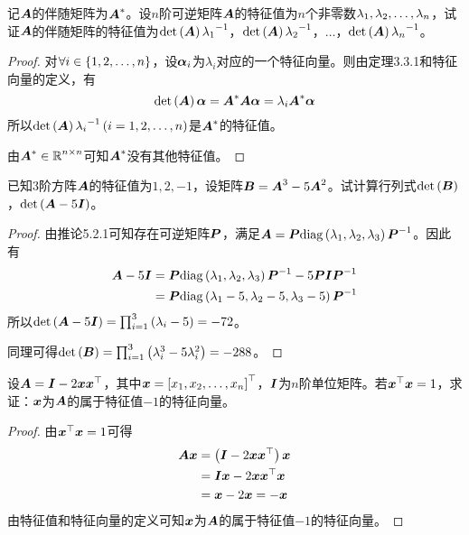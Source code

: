 \begin{problem}
记\(\mata\)的伴随矩阵为\(\mata^*\)。设\(n\)阶可逆矩阵\(\mata\)的特征值为\(n\)个非零数\(\enums{\lambda}{n}\)，试证\(\mata\)的伴随矩阵的特征值为\(\det{\mata}\inv{\lambda_1}\)，\(\det{\mata}\inv{\lambda_2}\)，\(\dots\)，\(\det{\mata}\inv{\lambda_n}\)。
\end{problem}
\begin{proof}
    对\(\forall i\in\setof{1,2,\dots,n}\)，设\(\vecal_i\)为\(\lambda_i\)对应的一个特征向量。则由定理3.3.1和特征向量的定义，有
    \begin{equation*}
        \det{\mata}\vecal=\mata^*\mata\vecal=\lambda_i\mata^*\vecal
    \end{equation*}
    所以\(\det{\mata}\inv{\lambda_i}\mypar{i=1,2,\dots,n}\)是\(\mata^*\)的特征值。

    由\(\mata^*\in\rea^{n\times n}\)可知\(\mata^*\)没有其他特征值。
\end{proof}

\begin{problem}
已知\(3\)阶方阵\(\mata\)的特征值为\(1,2,-1\)，设矩阵\(\matb=\mata^3-5\mata^2\)。试计算行列式\(\det{\matb}\)，\(\det{\mata-5\mati}\)。
\end{problem}
\begin{proof}
    由推论5.2.1可知存在可逆矩阵\(\matp\)，满足\(\mata=\matp\diag{\lambda_1,\lambda_2,\lambda_3}\inv{\matp}\)。因此有
    \begin{align*}
        \mata-5\mati & =\matp\diag{\lambda_1,\lambda_2,\lambda_3}\inv{\matp}-5\matp\mati\inv{\matp} \\
                     & =\matp\diag{\lambda_1-5,\lambda_2-5,\lambda_3-5}\inv{\matp}
    \end{align*}
    所以\(\det{\mata-5\mati}=\prod_{i=1}^3\mypar{\lambda_i-5}=-72\)。

    同理可得\(\det{\matb}=\prod_{i=1}^3\mypar{\lambda_i^3-5\lambda_i^2}=-288\)。
\end{proof}

\begin{problem}
设\(\mata=\mati-2\vecx\vecx^\top\)，其中\(\vecx=\myvec{\enums{x}{n}}\)，\(\mati\)为\(n\)阶单位矩阵。若\(\vecx^\top\vecx=1\)，求证：\(\vecx\)为\(\mata\)的属于特征值\(-1\)的特征向量。
\end{problem}
\begin{proof}
    由\(\vecx^\top\vecx=1\)可得
    \begin{align*}
        \mata\vecx & =\mypar{\mati-2\vecx\vecx^\top}\vecx \\
                   & =\mati\vecx-2\vecx\vecx^\top\vecx    \\
                   & =\vecx-2\vecx=-\vecx
    \end{align*}
    由特征值和特征向量的定义可知\(\vecx\)为\(\mata\)的属于特征值\(-1\)的特征向量。
\end{proof}

